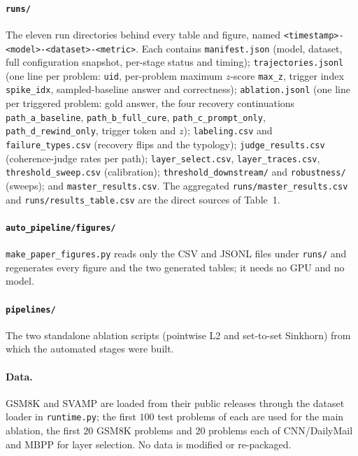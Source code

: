\documentclass{article}
\begin{document}
\paragraph{\texttt{runs/}} The eleven run directories behind every table and figure, named \texttt{<timestamp>-<model>-<dataset>-<metric>}. Each contains \texttt{manifest.json} (model, dataset, full configuration snapshot, per-stage status and timing); \texttt{trajectories.jsonl} (one line per problem: \texttt{uid}, per-problem maximum $z$-score \texttt{max\_z}, trigger index \texttt{spike\_idx}, sampled-baseline answer and correctness); \texttt{ablation.jsonl} (one line per triggered problem: gold answer, the four recovery continuations \texttt{path\_a\_baseline}, \texttt{path\_b\_full\_cure}, \texttt{path\_c\_prompt\_only}, \texttt{path\_d\_rewind\_only}, trigger token and $z$); \texttt{labeling.csv} and \texttt{failure\_types.csv} (recovery flips and the typology); \texttt{judge\_results.csv} (coherence-judge rates per path); \texttt{layer\_select.csv}, \texttt{layer\_traces.csv}, \texttt{threshold\_sweep.csv} (calibration); \texttt{threshold\_downstream/} and \texttt{robustness/} (sweeps); and \texttt{master\_results.csv}. The aggregated \texttt{runs/master\_results.csv} and \texttt{runs/results\_table.csv} are the direct sources of Table~1.

\paragraph{\texttt{auto\_pipeline/figures/}} \texttt{make\_paper\_figures.py} reads only the CSV and JSONL files under \texttt{runs/} and regenerates every figure and the two generated tables; it needs no GPU and no model.

\paragraph{\texttt{pipelines/}} The two standalone ablation scripts (pointwise L2 and set-to-set Sinkhorn) from which the automated stages were built.

\paragraph{Data.} GSM8K and SVAMP are loaded from their public releases through the dataset loader in \texttt{runtime.py}; the first $100$ test problems of each are used for the main ablation, the first $20$ GSM8K problems and $20$ problems each of CNN/DailyMail and MBPP for layer selection. No data is modified or re-packaged.
\end{document}
